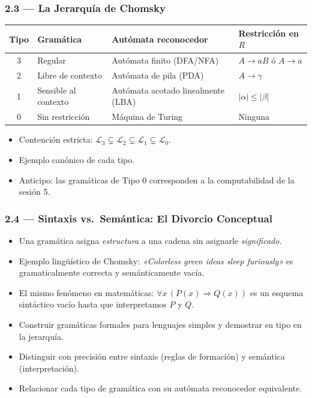 \documentclass[11pt, letterpaper]{article}
\begin{document}
\subsubsection{2.3 — La Jerarquía de Chomsky}
\begin{center}
\renewcommand{\arraystretch}{1.3}
\begin{tabular}{clll}
\toprule
\textbf{Tipo} & \textbf{Gramática} & \textbf{Autómata reconocedor} & \textbf{Restricción en $R$}\\
\midrule
3 & Regular          & Autómata finito (DFA/NFA)         & $A\to aB$ ó $A\to a$ \\
2 & Libre de contexto & Autómata de pila (PDA)            & $A\to\gamma$ \\
1 & Sensible al contexto & Autómata acotado linealmente (LBA) & $|\alpha|\leq|\beta|$ \\
0 & Sin restricción  & Máquina de Turing                 & Ninguna \\
\bottomrule
\end{tabular}
\end{center}
\begin{itemize}
  \item Contención estricta: $\mathcal{L}_3 \subsetneq \mathcal{L}_2 \subsetneq \mathcal{L}_1 \subsetneq \mathcal{L}_0$.
  \item Ejemplo canónico de cada tipo.
  \item Anticipo: las gramáticas de Tipo 0 corresponden a la computabilidad de la sesión 5.
\end{itemize}

\subsubsection{2.4 — Sintaxis vs.\ Semántica: El Divorcio Conceptual}
\begin{itemize}
  \item Una gramática asigna \emph{estructura} a una cadena sin asignarle \emph{significado}.
  \item Ejemplo lingüístico de Chomsky: \textit{«Colorless green ideas sleep furiously»} es gramaticalmente correcta y semánticamente vacía.
  \item El mismo fenómeno en matemáticas: $\forall x\,(P(x)\Rightarrow Q(x))$ es un esquema sintáctico vacío hasta que interpretamos $P$ y $Q$.
\end{itemize}

\begin{objetivos}
\begin{itemize}
  \item Construir gramáticas formales para lenguajes simples y demostrar su tipo en la jerarquía.
  \item Distinguir con precisión entre sintaxis (reglas de formación) y semántica (interpretación).
  \item Relacionar cada tipo de gramática con su autómata reconocedor equivalente.
\end{itemize}
\end{objetivos}
\end{document}
